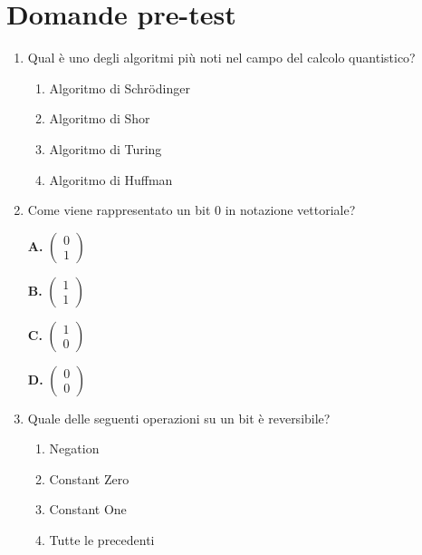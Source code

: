 \documentclass[10pt]{article}
\begin{document}
\section*{Domande pre-test}

\begin{enumerate}[label=\textbf{Domanda \arabic*.}]

\item Qual è uno degli algoritmi più noti nel campo del calcolo quantistico?
\begin{enumerate}[label=\Alph*.]
    \item Algoritmo di Schrödinger
    \item Algoritmo di Shor
    \item Algoritmo di Turing
    \item Algoritmo di Huffman
\end{enumerate}


\item Come viene rappresentato un bit 0 in notazione vettoriale?
\noindent
\\
\begin{minipage}{.5\linewidth}
    \textbf{A.}
    \( 
    \begin{pmatrix} 
        0 \\ 
        1 
    \end{pmatrix} 
    \)
\end{minipage}%
\begin{minipage}{.5\linewidth}
    \textbf{B.}
    \( 
    \begin{pmatrix} 
        1 \\ 
        1 
    \end{pmatrix} 
    \)
\end{minipage}

\noindent
\begin{minipage}{.5\linewidth}
    \textbf{C.}
    \( 
    \begin{pmatrix} 
        1 \\ 
        0 
    \end{pmatrix} 
    \)
\end{minipage}%
\begin{minipage}{.5\linewidth}
    \textbf{D.}
    \( 
    \begin{pmatrix} 
        0 \\ 
        0 
    \end{pmatrix} 
    \)
\end{minipage}

\item Quale delle seguenti operazioni su un bit è reversibile?
\begin{enumerate}[label=\Alph*.]
    \item Negation
    \item Constant Zero
    \item Constant One
    \item Tutte le precedenti
\end{enumerate}



\end{enumerate}
\end{document}

